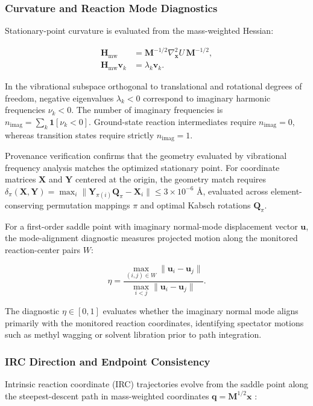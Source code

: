 \subsubsection{Curvature and Reaction Mode Diagnostics}
Stationary-point curvature is evaluated from the mass-weighted Hessian:

\begin{equation}\label{eq:methods-10}
\begin{aligned}
\mathbf{H}_{\mathrm{mw}}&=\mathbf{M}^{-1/2}\nabla_{\mathbf{x}}^2 U\,\mathbf{M}^{-1/2},\\
\mathbf{H}_{\mathrm{mw}}\mathbf{v}_k&=\lambda_k\mathbf{v}_k.
\end{aligned}
\end{equation}

In the vibrational subspace orthogonal to translational and rotational degrees of freedom, negative eigenvalues $\lambda_k<0$ correspond to imaginary harmonic frequencies $\nu_k<0$. The number of imaginary frequencies is $n_{\mathrm{imag}}=\sum_k \mathbf{1}[\nu_k<0]$. Ground-state reaction intermediates require $n_{\mathrm{imag}}=0$, whereas transition states require strictly $n_{\mathrm{imag}}=1$.

Provenance verification confirms that the geometry evaluated by vibrational frequency analysis matches the optimized stationary point. For coordinate matrices $\mathbf{X}$ and $\mathbf{Y}$ centered at the origin, the geometry match requires $\delta_\pi(\mathbf{X},\mathbf{Y})=\max_i\|\mathbf{Y}_{\pi(i)}\mathbf{Q}_\pi-\mathbf{X}_i\|\le 3\times 10^{-6}\text{ Å}$, evaluated across element-conserving permutation mappings $\pi$ and optimal Kabsch rotations $\mathbf{Q}_\pi$.

For a first-order saddle point with imaginary normal-mode displacement vector $\mathbf{u}$, the mode-alignment diagnostic measures projected motion along the monitored reaction-center pairs $W$:

\begin{equation}\label{eq:methods-11}
\eta=\frac{\max_{(i,j)\in W}\|\mathbf{u}_i-\mathbf{u}_j\|}{\max_{i<j}\|\mathbf{u}_i-\mathbf{u}_j\|}.
\end{equation}

The diagnostic $\eta\in[0,1]$ evaluates whether the imaginary normal mode aligns primarily with the monitored reaction coordinates, identifying spectator motions such as methyl wagging or solvent libration prior to path integration.

\subsubsection{IRC Direction and Endpoint Consistency}
Intrinsic reaction coordinate (IRC) trajectories evolve from the saddle point along the steepest-descent path in mass-weighted coordinates $\mathbf{q}=\mathbf{M}^{1/2}\mathbf{x}$ \citep{ref09,ref10}:

